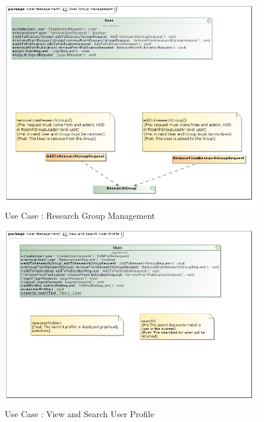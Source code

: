 \documentclass{article}
\begin{document}
		\begin{figure}[H]
			\includegraphics[scale=0.6]{ReinhardtImages/User Group Management.jpg}
			\caption{Use Case : Research Group Management}
	  		\label{Use Case : Research Group Management}
		\end{figure}
		\begin{figure}[H]
			\includegraphics[scale=0.6]{ReinhardtImages/View and search User Profile.jpg}
			\caption{Use Case : View and Search User Profile}
	  		\label{Use Case : View and Search User Profile}
		\end{figure}
\end{document}
